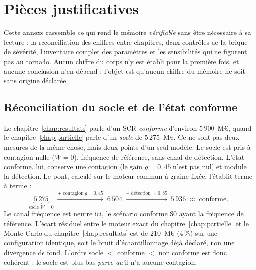 \chapter{Pièces justificatives}
\label{ann:pieces}

Cette annexe rassemble ce qui rend le mémoire \emph{vérifiable} sans être nécessaire à sa
lecture : la réconciliation des chiffres entre chapitres, deux contrôles de la brique de sévérité, l'inventaire complet des paramètres et les
sensibilités qui ne figurent pas au tornado. Aucun chiffre du corps n'y est établi pour la
première fois, et aucune conclusion n'en dépend ; l'objet est qu'aucun chiffre du mémoire ne soit
sans origine déclarée.

\section{Réconciliation du socle et de l'état conforme}
\label{sec:ann-reconciliation}

Le chapitre~\ref{chap:resultats} parle d'un SCR \emph{conforme} d'environ $5\,900$~M\euro{},
quand le chapitre~\ref{chap:partielle} parle d'un \emph{socle} de $5\,275$~M\euro{}. Ce ne
sont pas deux mesures de la même chose, mais deux points d'un seul modèle. Le socle est pris à
contagion nulle ($W=0$), fréquence de référence, sans canal de détection. L'état
conforme, lui, conserve une contagion (le gain $g=0{,}45$ n'est pas nul) et module la
détection. Le pont, calculé sur le moteur commun à graine fixée, l'établit terme à terme :
\[
  \underbrace{5\,275}_{\text{socle }W=0}\;\xrightarrow{+\text{ contagion }g=0{,}45}\;6\,504
  \;\xrightarrow{+\text{ détection }\times 0{,}85}\;5\,936\;\approx\;\text{conforme}.
\]
Le canal fréquence est neutre ici, le scénario conforme S0 ayant la fréquence de référence.
L'écart résiduel entre le moteur exact du chapitre~\ref{chap:partielle} et le Monte-Carlo du
chapitre~\ref{chap:resultats} est de $210$~M\euro{} ($4\,\%$) sur une configuration identique,
soit le bruit d'échantillonnage déjà déclaré, non une divergence de fond. L'ordre socle $<$
conforme $<$ non conforme est donc cohérent : le socle est plus bas \emph{parce qu'}il n'a
aucune contagion.

